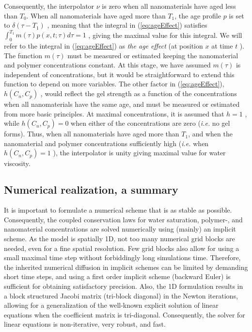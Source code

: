 \documentclass[energies,article,submit,moreauthors,pdftex]{Definitions/mdpi}
\begin{document}
Consequently, the interpolator  $\nu$ is zero when all nanomaterials have aged less than  $T_0$. When all nanomaterials have aged more than  $T_1$, the age profile $p$ is set to  $\delta(\tau-T_1)$ , meaning that the integral in (\ref{eq:ageEffect}) satisfies $\int^{T_1}_{0}m(\tau)p(x,t;\tau)d\tau=1$ , giving the maximal value for this integral. We will refer to the integral in (\ref{eq:ageEffect})  as \textit{the age effect} (at position $x$ at time $t$ ). The function $m(\tau)$ must be measured or estimated keeping the nanomaterial and polymer concentrations constant. At this stage, we have assumed  $m(\tau)$ is independent of concentrations, but it would be straightforward to extend this function to depend on more variables. The other factor in (\ref{eq:ageEffect}), $h(C_n,C_p)$ , would reflect the gel strength as a function of the concentrations when all nanomaterials have the same age, and must be measured or estimated from more basic principles. At maximal concentrations, it is assumed that $h=1$ , while $h(C_n,C_p)=0$ when either of the concentrations are zero (\textit{i.e.} no gel forms). Thus, when all nanomaterials have aged more than $T_1$, and when the nanomaterial and polymer concentrations sufficiently high (\textit{i.e.} when $h(C_n,C_p)=1$ ), the interpolator is unity giving maximal value for water viscosity.

\subsection{Numerical realization, a summary}
It is important to formulate a numerical scheme that is as stable as possible. Consequently, the coupled conservation laws for water saturation, polymer-, and nanomaterial concentrations are solved numerically using (mainly) an implicit scheme. As the model is spatially 1D, not too many numerical grid blocks are needed, even for a fine spatial resolution. Few grid blocks also allow for using a small maximal time step without forbiddingly long simulations time. Therefore, the inherited numerical diffusion in implicit schemes can be limited by demanding short time steps, and using a first order implicit scheme (backward Euler) is sufficient for obtaining satisfactory precision. Also, the 1D formulation results in a block structured Jacobi matrix (tri-block diagonal) in the Newton iterations, allowing for a generalization of the well-known explicit solution of linear equations when the coefficient matrix is tri-diagonal. Consequently, the solver for linear equations is non-iterative, very robust, and fast. 
\end{document}
